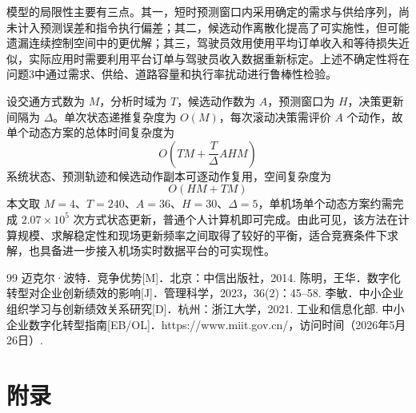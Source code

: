 \documentclass[UTF8,a4paper,11pt,onecolumn,fontset=none]{ctexart}
\begin{document}
模型的局限性主要有三点。其一，短时预测窗口内采用确定的需求与供给序列，尚未计入预测误差和指令执行偏差；其二，候选动作离散化提高了可实施性，但可能遗漏连续控制空间中的更优解；其三，驾驶员效用使用平均订单收入和等待损失近似，实际应用时需要利用平台订单与驾驶员收入数据重新标定。上述不确定性将在问题3中通过需求、供给、道路容量和执行率扰动进行鲁棒性检验。

设交通方式数为 $M$，分析时域为 $T$，候选动作数为 $A$，预测窗口为 $H$，决策更新间隔为 $\Delta$。单次状态递推复杂度为 $O(M)$，每次滚动决策需评价 $A$ 个动作，故单个动态方案的总体时间复杂度为
\begin{equation}
  O\left(
  TM+\frac{T}{\Delta}AHM
  \right)
  \label{eq:q2-time-complexity}
\end{equation}
系统状态、预测轨迹和候选动作副本可逐动作复用，空间复杂度为
\begin{equation}
  O(HM+TM)
  \label{eq:q2-space-complexity}
\end{equation}
本文取 $M=4$、$T=240$、$A=36$、$H=30$、$\Delta=5$，单机场单个动态方案约需完成 $2.07\times10^5$ 次方式状态更新，普通个人计算机即可完成。由此可见，该方法在计算规模、求解稳定性和现场更新频率之间取得了较好的平衡，适合竞赛条件下求解，也具备进一步接入机场实时数据平台的可实现性。

\begin{thebibliography}{99}
  迈克尔·波特．竞争优势[M]．北京：中信出版社，2014.
  陈明，王华．数字化转型对企业创新绩效的影响[J]．管理科学，2023，36(2)：45--58.
  李敏．中小企业组织学习与创新绩效关系研究[D]．杭州：浙江大学，2021.
  工业和信息化部. 中小企业数字化转型指南[EB/OL]．https://www.miit.gov.cn/，访问时间（2026年5月26日）.
\end{thebibliography}

\section*{附录}
\end{document}
